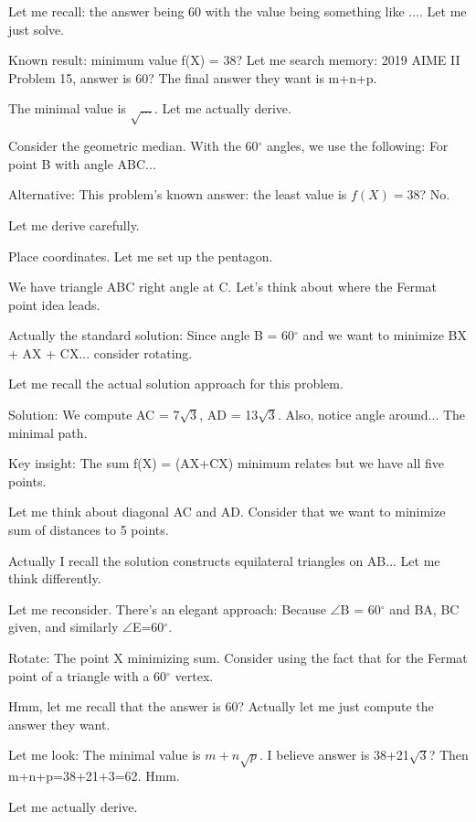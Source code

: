 \begin{decodedreasoningpanel}
Let me recall: the answer being 60 with the value being something like $... $. Let me just solve.

Known result: minimum value f(X) = 38? Let me search memory: 2019 AIME II Problem 15, answer is 60? The final answer they want is m+n+p.

The minimal value is $\sqrt{ ... }$. Let me actually derive.

Consider the geometric median. With the 60\ensuremath{^\circ} angles, we use the following: For point B with angle ABC... 

Alternative: This problem's known answer: the least value is $f(X)=38$? No.

Let me derive carefully.

Place coordinates. Let me set up the pentagon.

We have triangle ABC right angle at C. Let's think about where the Fermat point idea leads.

Actually the standard solution: Since angle B = 60\ensuremath{^\circ} and we want to minimize BX + AX + CX... consider rotating.

Let me recall the actual solution approach for this problem.

Solution: We compute AC = 7\ensuremath{\sqrt{3}}, AD = 13\ensuremath{\sqrt{3}}. Also, notice angle around... The minimal path.

Key insight: The sum f(X) = (AX+CX) minimum relates but we have all five points.

Let me think about diagonal AC and AD. Consider that we want to minimize sum of distances to 5 points.

Actually I recall the solution constructs equilateral triangles on AB... Let me think differently.

Let me reconsider. There's an elegant approach: Because \ensuremath{\angle}B = 60\ensuremath{^\circ} and BA, BC given, and similarly \ensuremath{\angle}E=60\ensuremath{^\circ}.

Rotate: The point X minimizing sum. Consider using the fact that for the Fermat point of a triangle with a 60\ensuremath{^\circ} vertex.

Hmm, let me recall that the answer is $\boxed{60}$? Actually let me just compute the answer they want.

Let me look: The minimal value is $m+n\sqrt p$. I believe answer is 38+21\ensuremath{\sqrt{3}}? Then m+n+p=38+21+3=62. Hmm.

Let me actually derive.


\end{decodedreasoningpanel}

